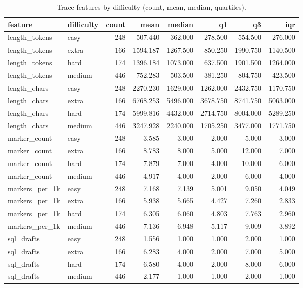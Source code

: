 \begin{table}[htbp]
\caption{Trace features by difficulty (count, mean, median, quartiles).}
\label{tab:task2_desc_by_difficulty}
\begin{tabular}{llrrrrrr}
\toprule
feature & difficulty & count & mean & median & q1 & q3 & iqr \\
\midrule
length_tokens & easy & 248 & 507.440 & 362.000 & 278.500 & 554.500 & 276.000 \\
length_tokens & extra & 166 & 1594.187 & 1267.500 & 850.250 & 1990.750 & 1140.500 \\
length_tokens & hard & 174 & 1396.184 & 1073.000 & 637.500 & 1901.500 & 1264.000 \\
length_tokens & medium & 446 & 752.283 & 503.500 & 381.250 & 804.750 & 423.500 \\
length_chars & easy & 248 & 2270.230 & 1629.000 & 1262.000 & 2432.750 & 1170.750 \\
length_chars & extra & 166 & 6768.253 & 5496.000 & 3678.750 & 8741.750 & 5063.000 \\
length_chars & hard & 174 & 5999.816 & 4432.000 & 2714.750 & 8004.000 & 5289.250 \\
length_chars & medium & 446 & 3247.928 & 2240.000 & 1705.250 & 3477.000 & 1771.750 \\
marker_count & easy & 248 & 3.585 & 3.000 & 2.000 & 5.000 & 3.000 \\
marker_count & extra & 166 & 8.783 & 8.000 & 5.000 & 12.000 & 7.000 \\
marker_count & hard & 174 & 7.879 & 7.000 & 4.000 & 10.000 & 6.000 \\
marker_count & medium & 446 & 4.917 & 4.000 & 2.000 & 6.000 & 4.000 \\
markers_per_1k & easy & 248 & 7.168 & 7.139 & 5.001 & 9.050 & 4.049 \\
markers_per_1k & extra & 166 & 5.938 & 5.665 & 4.427 & 7.260 & 2.833 \\
markers_per_1k & hard & 174 & 6.305 & 6.060 & 4.803 & 7.763 & 2.960 \\
markers_per_1k & medium & 446 & 7.136 & 6.948 & 5.117 & 9.009 & 3.892 \\
sql_drafts & easy & 248 & 1.556 & 1.000 & 1.000 & 2.000 & 1.000 \\
sql_drafts & extra & 166 & 6.283 & 4.000 & 2.000 & 7.000 & 5.000 \\
sql_drafts & hard & 174 & 6.580 & 4.000 & 2.000 & 8.000 & 6.000 \\
sql_drafts & medium & 446 & 2.177 & 1.000 & 1.000 & 2.000 & 1.000 \\

\end{tabular}
\end{table}

